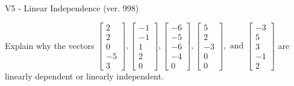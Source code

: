 \begin{exercise}
  \begin{exerciseTitle}V5 - Linear Independence (ver. 998)\end{exerciseTitle}
  \begin{exerciseStatement}
    Explain why the vectors \(\left[\begin{array}{r}
2 \\
2 \\
0 \\
-5 \\
3
\end{array}\right] , \left[\begin{array}{r}
-1 \\
-1 \\
1 \\
2 \\
0
\end{array}\right] , \left[\begin{array}{r}
-6 \\
-5 \\
-6 \\
-4 \\
0
\end{array}\right] , \left[\begin{array}{r}
5 \\
2 \\
-3 \\
0 \\
0
\end{array}\right] , \text{ and } \left[\begin{array}{r}
-3 \\
5 \\
3 \\
-1 \\
2
\end{array}\right]\) are linearly dependent or linearly independent.	



\end{exerciseStatement}
\end{exercise}
